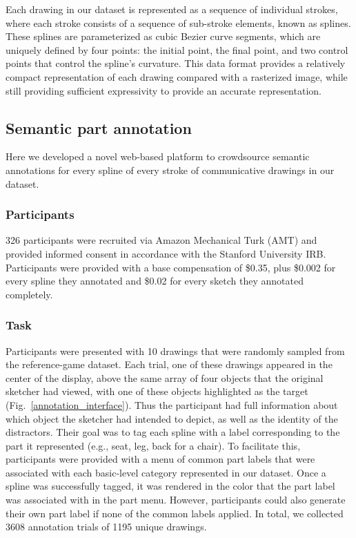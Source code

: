 \documentclass[10pt,letterpaper]{article}
\begin{document}
Each drawing in our dataset is represented as a sequence of individual strokes, where each stroke consists of a sequence of sub-stroke elements, known as splines. 
These splines are parameterized as cubic Bezier curve segments, which are uniquely defined by four points: the initial point, the final point, and two control points that control the spline's curvature.
This data format provides a relatively compact representation of each drawing compared with a rasterized image, while still providing sufficient expressivity to provide an accurate representation. 

\subsection{Semantic part annotation}

Here we developed a novel web-based platform to crowdsource semantic annotations for every spline of every stroke of communicative drawings in our dataset. 

\subsubsection{Participants}
326 participants were recruited via Amazon Mechanical Turk (AMT) and provided informed consent in accordance with the Stanford University IRB. 
Participants were provided with a base compensation of \$0.35, plus \$0.002 for every spline they annotated and \$0.02 for every sketch they annotated completely. 

\subsubsection{Task}
Participants were presented with 10 drawings that were randomly sampled from the reference-game dataset. 
Each trial, one of these drawings appeared in the center of the display, above the same array of four objects that the original sketcher had viewed, with one of these objects highlighted as the target (Fig.~\ref{annotation_interface}). 
Thus the participant had full information about which object the sketcher had intended to depict, as well as the identity of the distractors. 
Their goal was to tag each spline with a label corresponding to the part it represented (e.g., seat, leg, back for a chair). 
To facilitate this, participants were provided with a menu of common part labels that were associated with each basic-level category represented in our dataset. 
Once a spline was successfully tagged, it was rendered in the color that the part label was associated with in the part menu. 
However, participants could also generate their own part label if none of the common labels applied.
In total, we collected 3608 annotation trials of 1195 unique drawings.
\end{document}

